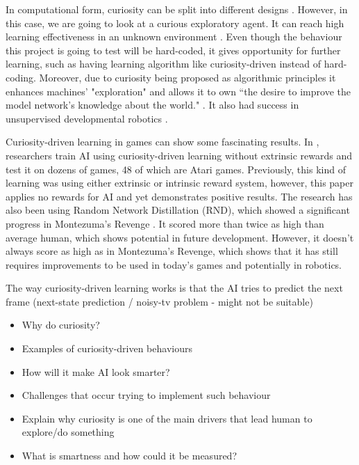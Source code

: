 \documentclass[journal]{IEEEtran}
\begin{document}
In computational form, curiosity can be split into different designs \cite{wu2013curiosity}. However, in this case, we are going to look at a curious exploratory agent. It can reach high learning effectiveness in an unknown environment \cite{wu2013curiosity}\cite{macedo2005role}. Even though the behaviour this project is going to test will be hard-coded, it gives opportunity for further learning, such as having learning algorithm like curiosity-driven instead of hard-coding. Moreover, due to curiosity being proposed as algorithmic principles \cite{wu2013curiosity}\cite{pang2009curiosity}\cite{karaoguz2011curiosity} it enhances machines' "exploration" and allows it to own ``the desire to improve the model network's knowledge about the world." \cite{schmidhuber1991possibility}. It also had success in unsupervised developmental robotics \cite{schmidhuber2006developmental}\cite{oudeyer2004intelligent}.

Curiosity-driven learning in games can show some fascinating results. In \cite{burda2018large}, researchers train AI using curiosity-driven learning without extrinsic rewards and test it on dozens of games, 48 of which are Atari games. Previously, this kind of learning was using either extrinsic or intrinsic reward system, however, this paper applies no rewards for AI and yet demonstrates positive results. The research has also been using Random Network Distillation (RND), which showed a significant progress in Montezuma's Revenge \cite{openairl}. It scored more than twice as high than average human, which shows potential in future development. However, it doesn't always score as high as in Montezuma's Revenge, which shows that it has still requires improvements to be used in today's games and potentially in robotics.

The way curiosity-driven learning works is that the AI tries to predict the next frame (next-state prediction / noisy-tv problem - might not be suitable)
\begin{itemize}
	\item Why do curiosity?
	\item Examples of curiosity-driven behaviours
	\item How will it make AI look smarter?
	\item Challenges that occur trying to implement such behaviour
	\item Explain why curiosity is one of the main drivers that lead human to explore/do something
	\item What is smartness and how could it be measured?
\end{itemize}
\end{document}
